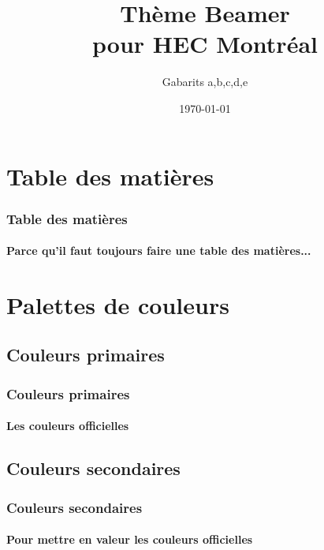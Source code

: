 \documentclass[aspectratio=1610,compress,t,gabarita,english,french]{hecppt}
\title{Thème Beamer \\ pour HEC Montréal}
\subtitle{Gabarits a,b,c,d,e}
\date[2018-01-30]{\today}
\begin{document}
\pageTitre

\section*{Table des matières}
\hypertarget{tdm}{}

\begin{frame}
	\frametitle{Table des matières}
	\framesubtitle{Parce qu'il faut toujours faire une table des matières...}
	\tableofcontents
\end{frame}

\section{Palettes de couleurs}
\hypertarget{paletteCouleurs}{}
\subsection{Couleurs primaires}

\begin{frame}[c]
	\frametitle{Couleurs primaires}
	\framesubtitle{Les couleurs officielles}
	\begin{list}{}{}
		\item {}
		\item {}
		\item {}
		\item {}
	\end{list}
\end{frame}

\subsection{Couleurs secondaires}

\begin{frame}[c]
	\frametitle{Couleurs secondaires}
	\framesubtitle{Pour mettre en valeur les couleurs officielles}
	\begin{list}{}{}
		\item {}
		\item {}
		\item {}
		\item {}
		\item {}
	\end{list}
\end{frame}
\end{document}
